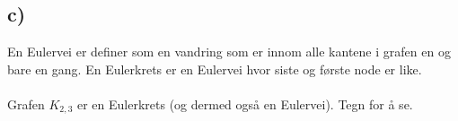 \documentclass[a4paper, norsk, 10pt]{article}
\begin{document}
\begin{flushleft}
  \subsection*{c)}
  En Eulervei er definer som en vandring som er innom alle kantene i grafen en og bare en gang. En Eulerkrets er en Eulervei hvor siste og første node er like.
  \\ \ \\
  Grafen $K_{2,3}$ er en Eulerkrets (og dermed også en Eulervei). Tegn for å se.

  
\end{flushleft}
\end{document}
